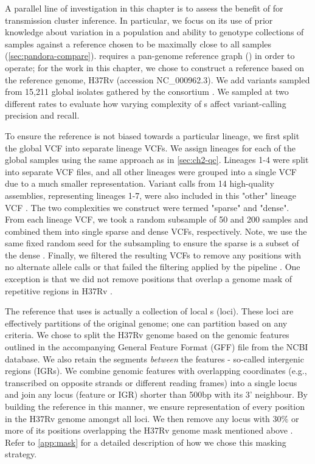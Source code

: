 A parallel line of investigation in this chapter is to assess the benefit of \pandora{} for \mtb{} transmission cluster inference. In particular, we focus on its use of prior knowledge about variation in a population and ability to genotype collections of samples against a reference chosen to be maximally close to all samples (\autoref{sec:pandora-compare}). \pandora{} requires a pan-genome reference graph (\panrg{}) in order to operate; for the work in this chapter, we chose to construct a reference \panrg{} based on the \mtb{} reference genome, H37Rv (accession NC\_000962.3). We add variants sampled from 15,211 global \mtb{} isolates gathered by the \cryptic{} consortium \cite{cryptic2021data}. We sampled at two different rates to evaluate how varying complexity of \panrg{}s affect variant-calling precision and recall.

To ensure the reference \panrg{} is not biased towards a particular lineage, we first split the global \cryptic{} VCF into separate lineage VCFs. We assign lineages for each of the global samples using the same approach as in \autoref{sec:ch2-qc}. Lineages 1-4 were split into separate VCF files, and all other lineages were grouped into a single VCF due to a much smaller representation. Variant calls from 14 high-quality \mtb{} assemblies, representing lineages 1-7, were also included in this "other" lineage VCF \cite{chiner2019,gramtools2021}. The two \panrg{} complexities we construct were termed "sparse" and "dense". From each lineage VCF, we took a random subsample of 50 and 200 samples and combined them into single sparse and dense VCFs, respectively. Note, we use the same fixed random seed for the subsampling to ensure the sparse \panrg{} is a subset of the dense \panrg{}. Finally, we filtered the resulting VCFs to remove any positions with no alternate allele calls or that failed the filtering applied by the \cryptic{} pipeline . One exception is that we did not remove positions that overlap a genome mask of repetitive regions in H37Rv \cite{tbmask2014}.  

The reference \panrg{} that \pandora{} uses is actually a collection of local \prg{}s (loci). These loci are effectively partitions of the original genome; one can partition based on any criteria. We chose to split the H37Rv genome based on the genomic features outlined in the accompanying General Feature Format (GFF) file from the NCBI database. We also retain the segments \emph{between} the features - so-called intergenic regions (IGRs). We combine genomic features with overlapping coordinates (e.g., transcribed on opposite strands or different reading frames) into a single locus and join any locus (feature or IGR) shorter than 500bp with its 3' neighbour. By building the reference \panrg{} in this manner, we ensure representation of every position in the H37Rv genome amongst all loci. We then remove any locus with 30\% or more of its positions overlapping the H37Rv genome mask mentioned above \cite{tbmask2014}. Refer to \autoref{app:mask} for a detailed description of how we chose this masking strategy.


